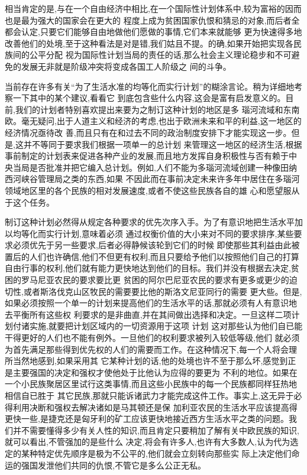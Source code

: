 ﻿\documentclass[12pt]{article}
\begin{document}
相当肯定的是,与在一个自由经济中相比,在一个国际性计划体系中,较为富裕的因而也是最为强大的国家会在更大的
程度上成为贫困国家仇恨和猜忌的对象,而后者全都会认定,只要它们能够自由地做他们愿做的事情,它们本来就能够
更为快速得多地改善他们的处境,至于这种看法是对是错,我们姑且不提。的确,如果开始把实现各民族间的公平分配
视为国际性计划当局的责任的话,那么社会主义理论稳步和不可避免的发展无非就是阶级冲突将变成各国工人阶级之
间的斗争。

当前存在许多有关``为了生活水准的均等化而实行计划''的糊涂言论。稍为详细地考察一下其中的某个建议,看看它
到底包含些什么内容,这会是富有启发意义的。目前,我们的计划者特别喜欢提出来要为之制订这种计划的地区是多
瑙河流域和东南欧。毫无疑问,出于人道主义和经济的考虑,也出于欧洲未来和平的利益,这一地区的经济情况亟待改
善,而且只有在和过去不同的政治制度安排下才能实现这一步。但是,这并不等同于要求我们根据一项单一的总计划
来管理这一地区的经济生活,根据事前制定的计划表来促进各种产业的发展,而且地方发挥自身积极性与否有赖于中
央当局是否批准并把它编入总计划。例如,人们不能为多瑙河流域创建一种像田纳西河峡谷管理局之类的东西,如果
不因此而在事前决定未来许多年中居住在多瑙河领域地区里的各个民族的相对发展速度,或者不使这些民族各自的雄
心和愿望服从于这个任务。

制订这种计划必然得从规定各种要求的优先次序入手。为了有意识地把生活水平加以均等化而实行计划,意味着必须
通过权衡价值的大小来对不同的要求排序,某些要求必须优先于另一些要求,后者必得静候该轮到它们的时候
\myrule 即使那些其利益由此被置后的人们也许确信,他们不但更有权利,而且只要给予他们以按照他们自己的打算
自由行事的权利,他们就有能力更快地达到他们的目标。我们并没有根据去决定,贫困的罗马尼亚农民的要求要比更
贫困的阿尔巴尼亚农民的要求有更多或更少的迫切性,或者斯洛伐克山区牧民的需要要比他的斯洛文尼亚同行的需要
更大些。但是,如果必须按照一个单一的计划来提高他们的生活水平的话,那就必须有人有意识地去平衡所有这些权
利要求的是非曲直,并在其间做出选择和决定。一旦这样二项计划付诸实施,就要把计划区域内的一切资源用于这项
计划 \myrule 这对那些认为他们自已能干得更好的人们也不能有例外。一旦他们的权利要求被列入较低等级,他们
就必须为首先满足那些得到优先权的人们的需要而工作。在这种情况下,每一个人将会理所当然地感到,如果采用其
它某种计划的话,他的处境也许不至于那么坏,感觉到正是主要强国的决定和强权才使他处于比他认为应得的要更为
不利的地位。如果在一个小民族聚居区里试行这类事情,而且这些小民族中的每一个民族都同样狂热地相信自已胜于
其它民族,那就只能诉诸武力才能完成这件工作。事实上,这无异于必得利用决断和强权去解决诸如是马其顿还是保
加利亚农民的生活水平应该提高得更快一些,是捷克还是匈牙利的矿工应该更快地接近西方生活水平之类的问题。我
们并不需要懂得多少有关人性的知识,而且肯定只要稍加了解有关中欧民族的知识,就可以看出,不管强加的是些什么
决定,将会有许多人,也许有大多数人,认为代为选定的某种特定优先顺序是极为不公平的,他们就会立刻转向那些实
际上决定他们命运的强国发泄他们共同的仇恨,不管它是多么公正无私。
\end{document}
